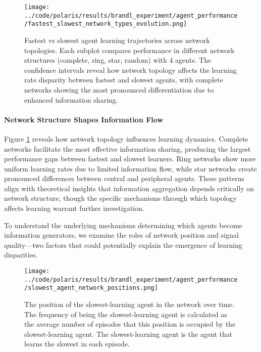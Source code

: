 \begin{figure}[!htbp]
    \centering
    \texttt{[image: ../code/polaris/results/brandl\_experiment/agent\_performance/fastest\_slowest\_network\_types\_evolution.png]}
    \caption{Fastest vs slowest agent learning trajectories across network topologies. Each subplot compares performance in different network structures (complete, ring, star, random) with 4 agents. The confidence intervals reveal how network topology affects the learning rate disparity between fastest and slowest agents, with complete networks showing the most pronounced differentiation due to enhanced information sharing.}
    \label{fig:type_comparison}
\end{figure}

\paragraph{Network Structure Shapes Information Flow} Figure \ref{fig:type_comparison} reveals how network topology influences learning dynamics. Complete networks facilitate the most effective information sharing, producing the largest performance gaps between fastest and slowest learners. Ring networks show more uniform learning rates due to limited information flow, while star networks create pronounced differences between central and peripheral agents. These patterns align with theoretical insights that information aggregation depends critically on network structure, though the specific mechanisms through which topology affects learning warrant further investigation.

To understand the underlying mechanisms determining which agents become information generators, we examine the roles of network position and signal quality—two factors that could potentially explain the emergence of learning disparities.

\begin{figure}[!htbp]
    \centering
    \texttt{[image: ../code/polaris/results/brandl\_experiment/agent\_performance/slowest\_agent\_network\_positions.png]}
    \caption{The position of the slowest-learning agent in the network over time. The frequency of being the slowest-learning agent is calculated as the average number of episodes that this position is occupied by the slowest-learning agent. The slowest-learning agent is the agent that learns the slowest in each episode.}
    \label{fig:slowest_agent_network_positions}
\end{figure}

